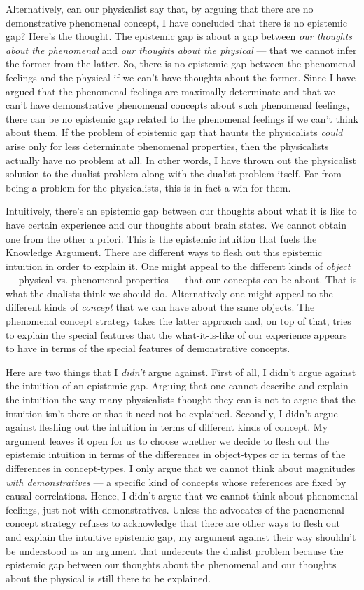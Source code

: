 \documentclass[a4paper,12pt]{article}
\begin{document}
Alternatively, can our physicalist say that, by arguing that there are no demonstrative phenomenal concept, I have concluded that there is no epistemic gap? Here's the thought. The epistemic gap is about a gap between \emph{our thoughts about the phenomenal} and \emph{our thoughts about the physical} --- that we cannot infer the former from the latter. So, there is no epistemic gap between the phenomenal feelings and the physical if we can't have thoughts about the former. Since I have argued that the phenomenal feelings are maximally determinate and that we can't have demonstrative phenomenal concepts about such phenomenal feelings, there can be no epistemic gap related to the phenomenal feelings if we can't think about them. If the problem of epistemic gap that haunts the physicalists \emph{could} arise only for less determinate phenomenal properties, then the physicalists actually have no problem at all. In other words, I have thrown out the physicalist solution to the dualist problem along with the dualist problem itself. Far from being a problem for the physicalists, this is in fact a win for them.

Intuitively, there's an epistemic gap between our thoughts about what it is like to have certain experience and our thoughts about brain states. We cannot obtain one from the other a priori. This is the epistemic intuition that fuels the Knowledge Argument. There are different ways to flesh out this epistemic intuition in order to explain it. One might appeal to the different kinds of \emph{object} --- physical vs. phenomenal properties --- that our concepts can be about. That is what the dualists think we should do. Alternatively one might appeal to the different kinds of \emph{concept} that we can have about the same objects. The phenomenal concept strategy takes the latter approach and, on top of that, tries to explain the special features that the what-it-is-like of our experience appears to have in terms of the special features of demonstrative concepts. 

Here are two things that I \emph{didn't} argue against. First of all, I didn't argue against the intuition of an epistemic gap. Arguing that one cannot describe and explain the intuition the way many physicalists thought they can is not to argue that the intuition isn't there or that it need not be explained. Secondly, I didn't argue against fleshing out the intuition in terms of different kinds of concept. My argument leaves it open for us to choose whether we decide to flesh out the epistemic intuition in terms of the differences in object-types or in terms of the differences in concept-types. I only argue that we cannot think about magnitudes \emph{with demonstratives} --- a specific kind of concepts whose references are fixed by causal correlations. Hence, I didn't argue that we cannot think about phenomenal feelings, just not with demonstratives. Unless the advocates of the phenomenal concept strategy refuses to acknowledge that there are other ways to flesh out and explain the intuitive epistemic gap, my argument against their way shouldn't be understood as an argument that undercuts the dualist problem because the epistemic gap between our thoughts about the phenomenal and our thoughts about the physical is still there to be explained.
\end{document}
